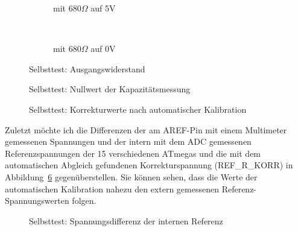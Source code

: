 \begin{figure}[H]
  \begin{subfigure}[b]{9cm}
  \centering
    \resizebox{9cm}{!}{}
    \caption{mit \(680 \Omega\) auf 5V}
    \label{fig:SelfTRoL}
  \end{subfigure}
  ~
  \begin{subfigure}[b]{9cm}
  \centering
    \resizebox{9cm}{!}{}
    \caption{mit \(680 \Omega\) auf 0V}
    \label{fig:SelfTRoH}
  \end{subfigure}
  \caption{Selbsttest: Ausgangswiderstand}
\end{figure}

\begin{figure}[H]
  \centering
  \resizebox{9cm}{!}{}
  \caption{Selbsttest: Nullwert der Kapazitätsmessung}
  \label{fig:SelfTcap}
\end{figure}

\begin{figure}[H]
  \centering
  \resizebox{9cm}{!}{}
  \caption{Selbsttest: Korrekturwerte nach automatischer Kalibration}
  \label{fig:SelfTrefKorr}
\end{figure}

Zuletzt möchte ich die Differenzen der am AREF-Pin mit einem Multimeter
gemessenen Spannungen und der intern mit dem ADC gemessenen Referenzspannungen der
15 verschiedenen ATmegas und die mit dem automatischen Abgleich
gefundenen Korrekturspannung (REF\_R\_KORR) in Abbildung~\ref{fig:SelfTrefDiff} gegenüberstellen.
Sie können sehen, dass die Werte der automatischen Kalibration nahezu den extern
gemessenen Referenz-Spannungswerten folgen.

\begin{figure}[H]
  \centering
  \resizebox{9cm}{!}{}
  \caption{Selbsttest: Spannungsdifferenz der internen Referenz}
  \label{fig:SelfTrefDiff}
\end{figure}

